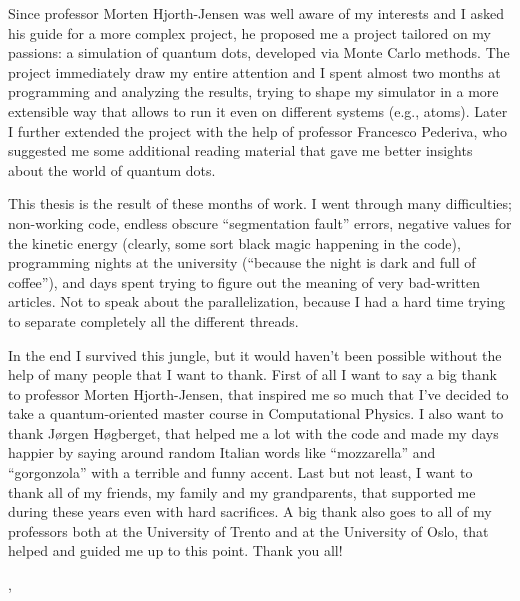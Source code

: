 Since professor Morten Hjorth-Jensen was well aware of my interests and I asked his guide for a more complex project, he proposed me a project tailored on my passions: a simulation of quantum dots, developed via Monte Carlo methods. The project immediately draw my entire attention and I spent almost two months at programming and analyzing the results, trying to shape my simulator in a more extensible way that allows to run it even on different systems (e.g., atoms). Later I further extended the project with the help of professor Francesco Pederiva, who suggested me some additional reading material that gave me better insights about the world of quantum dots.

This thesis is the result of these months of work. I went through many difficulties; non-working code, endless obscure ``segmentation fault'' errors, negative values for the kinetic energy (clearly, some sort black magic happening in the code), programming nights at the university (``because the night is dark and full of coffee''), and days spent trying to figure out the meaning of very bad-written articles. Not to speak about the parallelization, because I had a hard time trying to separate completely all the different threads.

In the end I survived this jungle, but it would haven't been possible without the help of many people that I want to thank. First of all I want to say a big thank to professor Morten Hjorth-Jensen, that inspired me so much that I've decided to take a quantum-oriented master course in Computational Physics. I also want to thank Jørgen Høgberget, that helped me a lot with the code and made my days happier by saying around random Italian words like ``mozzarella'' and ``gorgonzola'' with a terrible and funny accent. Last but not least, I want to thank all of my friends, my family and my grandparents, that supported me during these years even with hard sacrifices. A big thank also goes to all of my professors both at the University of Trento and at the University of Oslo, that helped and guided me up to this point. Thank you all!

\begin{flushright}
	{ \THauthor }
\end{flushright}
\begin{flushleft}
	{ \THplace, \THdate }
\end{flushleft}


